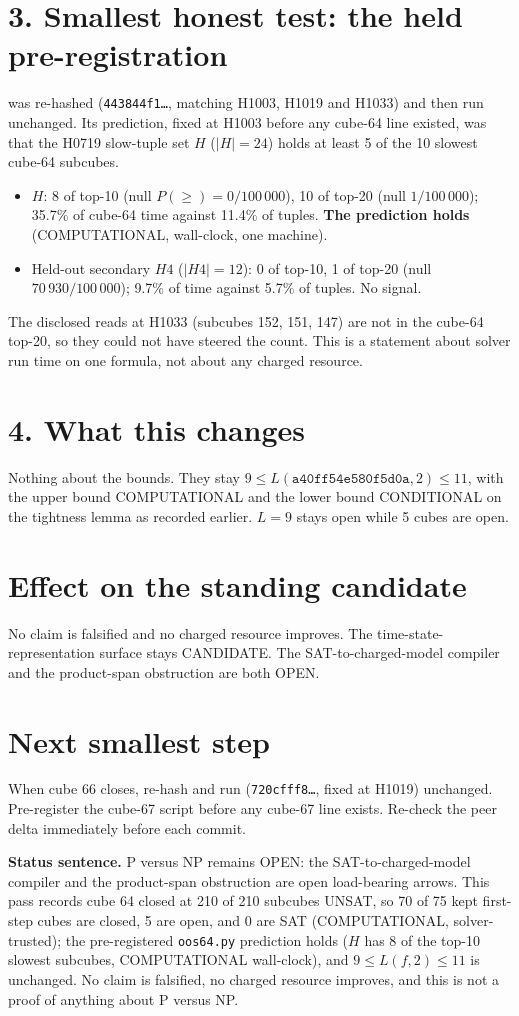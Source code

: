 \documentclass[11pt]{article}
\begin{document}
\section*{3. Smallest honest test: the held pre-registration}
 was re-hashed (\texttt{443844f1\ldots}, matching H1003, H1019 and H1033) and then run unchanged. Its prediction, fixed at H1003 before any cube-64 line existed, was that the H0719 slow-tuple set $H$ ($|H|=24$) holds at least 5 of the 10 slowest cube-64 subcubes.
\begin{itemize}
\item $H$: 8 of top-10 (null $P(\ge)=0/100\,000$), 10 of top-20 (null $1/100\,000$); 35.7\% of cube-64 time against 11.4\% of tuples. \textbf{The prediction holds} (COMPUTATIONAL, wall-clock, one machine).
\item Held-out secondary $H4$ ($|H4|=12$): 0 of top-10, 1 of top-20 (null $70\,930/100\,000$); 9.7\% of time against 5.7\% of tuples. No signal.
\end{itemize}
The disclosed reads at H1033 (subcubes 152, 151, 147) are not in the cube-64 top-20, so they could not have steered the count. This is a statement about solver run time on one formula, not about any charged resource.

\section*{4. What this changes}
Nothing about the bounds. They stay $9\le L(\texttt{a40ff54e580f5d0a},2)\le 11$, with the upper bound COMPUTATIONAL and the lower bound CONDITIONAL on the tightness lemma as recorded earlier. $L=9$ stays open while 5 cubes are open.

\section*{Effect on the standing candidate}
No claim is falsified and no charged resource improves. The time-state-representation surface stays CANDIDATE. The SAT-to-charged-model compiler and the product-span obstruction are both OPEN.

\section*{Next smallest step}
When cube 66 closes, re-hash and run  (\texttt{720cfff8\ldots}, fixed at H1019) unchanged. Pre-register the cube-67 script before any cube-67 line exists. Re-check the peer delta immediately before each commit.

\bigskip
\noindent\textbf{Status sentence.} P versus NP remains OPEN: the SAT-to-charged-model compiler and the product-span obstruction are open load-bearing arrows. This pass records cube 64 closed at 210 of 210 subcubes UNSAT, so 70 of 75 kept first-step cubes are closed, 5 are open, and 0 are SAT (COMPUTATIONAL, solver-trusted); the pre-registered \texttt{oos64.py} prediction holds ($H$ has 8 of the top-10 slowest subcubes, COMPUTATIONAL wall-clock), and $9\le L(f,2)\le 11$ is unchanged. No claim is falsified, no charged resource improves, and this is not a proof of anything about P versus NP.
\end{document}
